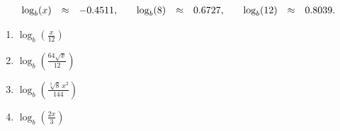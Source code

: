 \begin{enumerate}
\begin{equation*}
\begin{array}{rcl@{\hspace{2em}}rcl@{\hspace{2em}}rcl}
      \log_b(x) & \approx & -0.4511,&
      \log_b(8) & \approx & 0.6727,&
      \log_b(12) & \approx & 0.8039.
    \end{array}
  \end{equation*}
  \begin{enumerate}
  \item ${\displaystyle \log_b\left(\frac{x}{12} \right) }$
  \item ${\displaystyle \log_b\left(\frac{64\sqrt{x}}{12} \right) }$
  \item ${\displaystyle \log_b\left(\frac{ \sqrt[3]{8} \, x^2 }{144} \right) }$
  \item ${\displaystyle \log_b\left(\frac{2x}{3} \right) }$
  \end{enumerate}
\end{enumerate}
